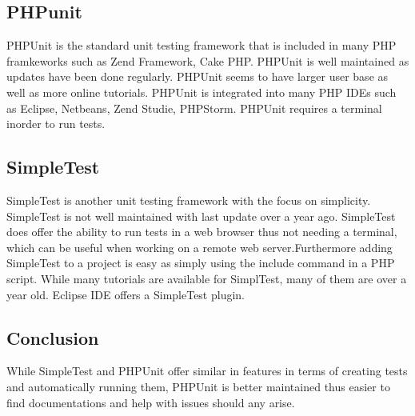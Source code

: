 \documentclass[a4paper,oneside,11pt]{report}
\begin{document}
\subsection{PHPunit}
PHPUnit is the standard unit testing framework that is included in many PHP framkeworks such as Zend Framework, Cake PHP. PHPUnit is well maintained as   updates have been done regularly. PHPUnit seems to have larger user base as well as more online tutorials. PHPUnit is integrated into many PHP IDEs  such as Eclipse, Netbeans, Zend Studie, PHPStorm. PHPUnit requires a terminal inorder to run tests.
\subsection{SimpleTest}
SimpleTest is another unit testing framework with the focus on simplicity. SimpleTest is not well maintained with last update over a year ago. SimpleTest does offer the ability to run tests in a web browser thus not needing a terminal, which can be useful when working on a remote web server.Furthermore adding SimpleTest to a project is easy as simply using the include command in a PHP script. While many tutorials are available for SimplTest, many of them are over a year  old. Eclipse IDE offers a SimpleTest plugin.

\subsection{Conclusion}
While SimpleTest and PHPUnit offer similar in features in terms of creating tests and automatically running them, PHPUnit is better maintained thus easier to find documentations and help with issues should any arise. 
\end{document}
